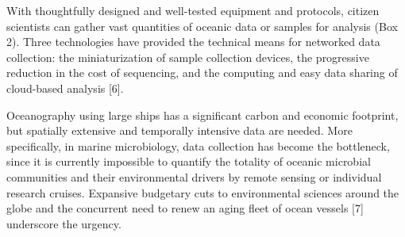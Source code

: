 With thoughtfully designed and well-tested equipment and protocols, citizen scientists can gather vast quantities of oceanic data or samples for analysis (Box 2). Three technologies have provided the technical means for networked data collection: the miniaturization of sample collection devices, the progressive reduction in the cost of sequencing, and the computing and easy data sharing of cloud-based analysis [6].

Oceanography using large ships has a significant carbon and economic footprint, but spatially extensive and temporally intensive data are needed. More specifically, in marine microbiology, data collection has become the bottleneck, since it is currently impossible to quantify the totality of oceanic microbial communities and their environmental drivers by remote sensing or individual research cruises. Expansive budgetary cuts to environmental sciences around the globe and the concurrent need to renew an aging fleet of ocean vessels [7] underscore the urgency.